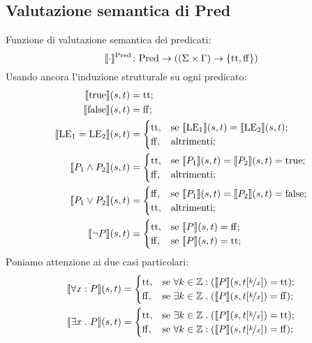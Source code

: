 \subsection{Valutazione semantica di Pred}
Funzione di valutazione semantica dei predicati:
\[
   \mathord{\llbracket \cdot \rrbracket ^{\mathrm{Pred}}}\colon\mathrm{Pred}\to((\Sigma \times \Gamma) \rightarrow \{\mathrm{tt},\mathrm{ff}\})
\]
Usando ancora l'induzione strutturale su ogni predicato:
\begin{align*}
   \llbracket \mathrm{true} \rrbracket(s,t)
      &= \mathrm{tt};\\
   \llbracket \mathrm{false} \rrbracket(s,t)
      &= \mathrm{ff};\\
   \llbracket \mathrm{LE}_1 = \mathrm{LE}_2\rrbracket(s,t)
      &=
        \begin{cases}
                \mathrm{tt}, &\text{se $\llbracket\mathrm{LE}_1\rrbracket(s,t) = \llbracket \mathrm{LE}_2 \rrbracket(s,t)$};\\
                \mathrm{ff}, &\text{altrimenti};
        \end{cases}\\
    \llbracket P_1 \land P_2\rrbracket(s,t)
      &=
        \begin{cases}
                \mathrm{tt}, &\text{se $\llbracket P_1\rrbracket(s,t) = \llbracket P_2\rrbracket(s,t) = \mathrm{true}$};\\
                \mathrm{ff}, &\text{altrimenti};
        \end{cases}\\
    \llbracket P_1 \lor P_2\rrbracket(s,t)
      &=
        \begin{cases}
                \mathrm{ff}, &\text{se $\llbracket P_1\rrbracket(s,t) = \llbracket P_2\rrbracket(s,t) = \mathrm{false}$};\\
                \mathrm{tt}, &\text{altrimenti};
        \end{cases} \\
    \llbracket \neg P\rrbracket(s,t)
       &=
        \begin{cases}
                \mathrm{tt},&\text{se $\llbracket P\rrbracket(s,t) = \mathrm{ff}$};\\
                \mathrm{ff},&\text{se $\llbracket P\rrbracket(s,t) = \mathrm{tt}$};
        \end{cases}
\end{align*}
Poniamo attenzione ai due casi particolari:
\begin{align*}
   \llbracket\forall x \mathrel{:} P\rrbracket(s,t)
      &=
        \begin{cases}
                \mathrm{tt}, &\text{se $\forall k\in\mathbb{Z}\mathrel{:}(\llbracket P\rrbracket(s,t[\nicefrac{k}{x}]) = \mathrm{tt}$});\\
                \mathrm{ff}, &\text{se $\exists k\in\mathbb{Z}\mathrel{.}(\llbracket P\rrbracket(s,t[\nicefrac{k}{x}]) = \mathrm{ff}$});
        \end{cases}\\
   \llbracket \exists x \mathrel{.} P\rrbracket(s,t)
      &=
        \begin{cases}
                \mathrm{tt},  &\text{se $\exists k\in \mathbb{Z}\mathrel{.}(\llbracket P\rrbracket(s,t[\nicefrac{k}{x}]) = \mathrm{tt}$});\\
                \mathrm{ff},  &\text{se $\forall k\in \mathbb{Z}\mathrel{:}(\llbracket P\rrbracket(s,t[\nicefrac{k}{x}]) = \mathrm{ff}$});
        \end{cases}
\end{align*}
